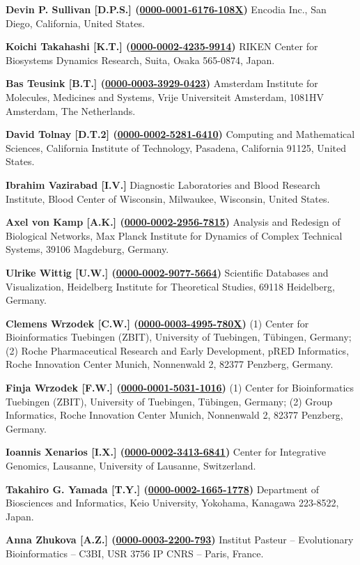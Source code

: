 \documentclass{sbml-paper}
\newcommand{\orcid}[1]{\href{https://orcid.org/#1}{#1}}
\begin{document}
\textbf{Devin P. Sullivan [D.P.S.] (\orcid{0000-0001-6176-108X})} Encodia Inc., San Diego, California, United States.

\textbf{Koichi Takahashi [K.T.] (\orcid{0000-0002-4235-9914})} RIKEN Center for Biosystems Dynamics Research, Suita, Osaka 565-0874, Japan.

\textbf{Bas Teusink [B.T.] (\orcid{0000-0003-3929-0423})} Amsterdam Institute for Molecules, Medicines and Systems, Vrije Universiteit Amsterdam, 1081HV Amsterdam, The Netherlands.

\textbf{David Tolnay [D.T.2] (\orcid{0000-0002-5281-6410})} Computing and Mathematical Sciences, California Institute of Technology, Pasadena, California 91125, United States.

\textbf{Ibrahim Vazirabad [I.V.]} Diagnostic Laboratories and Blood Research Institute, Blood Center of Wisconsin, Milwaukee, Wisconsin, United States.

\textbf{Axel von Kamp [A.K.] (\orcid{0000-0002-2956-7815})} Analysis and Redesign of Biological Networks, Max Planck Institute for Dynamics of Complex Technical Systems, 39106 Magdeburg, Germany.

\textbf{Ulrike Wittig [U.W.] (\orcid{0000-0002-9077-5664})} Scientific Databases and Visualization, Heidelberg Institute for Theoretical Studies, 69118 Heidelberg, Germany.

\textbf{Clemens Wrzodek [C.W.] (\orcid{0000-0003-4995-780X})} (1) Center for Bioinformatics Tuebingen (ZBIT), University of Tuebingen, T\"{u}bingen, Germany; (2) Roche Pharmaceutical Research and Early Development, pRED Informatics, Roche Innovation Center Munich, Nonnenwald 2, 82377 Penzberg, Germany.

\textbf{Finja Wrzodek [F.W.] (\orcid{0000-0001-5031-1016})} (1) Center for Bioinformatics Tuebingen (ZBIT), University of Tuebingen, T\"{u}bingen, Germany; (2) Group Informatics, Roche Innovation Center Munich, Nonnenwald 2, 82377 Penzberg, Germany.

\textbf{Ioannis Xenarios [I.X.] (\orcid{0000-0002-3413-6841})} Center for Integrative Genomics, Lausanne, University of Lausanne, Switzerland.

\textbf{Takahiro G. Yamada [T.Y.] (\orcid{0000-0002-1665-1778})} Department of Biosciences and Informatics, Keio University, Yokohama, Kanagawa 223-8522, Japan.

\textbf{Anna Zhukova [A.Z.] (\orcid{0000-0003-2200-793})} Institut Pasteur – Evolutionary Bioinformatics – C3BI, USR 3756 IP CNRS – Paris, France.
\end{document}
